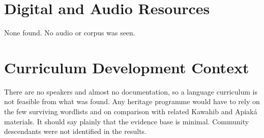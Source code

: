 \documentclass[12pt]{article}
\begin{document}
\section{Digital and Audio Resources}
None found. No audio or corpus was seen.

\section{Curriculum Development Context}
There are no speakers and almost no documentation, so a language curriculum is not feasible from what was found. Any heritage programme would have to rely on the few surviving wordlists and on comparison with related Kawahib and Apiak\'a materials. It should say plainly that the evidence base is minimal. Community descendants were not identified in the results.
\end{document}
